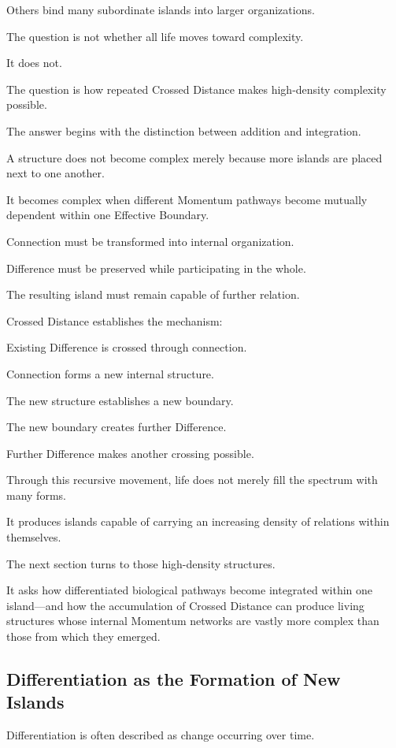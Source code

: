 Others bind many subordinate islands into larger organizations.

The question is not whether all life moves toward complexity.

It does not.

The question is how repeated Crossed Distance makes high-density complexity possible.

The answer begins with the distinction between addition and integration.

A structure does not become complex merely because more islands are placed next to one another.

It becomes complex when different Momentum pathways become mutually dependent within one Effective Boundary.

Connection must be transformed into internal organization.

Difference must be preserved while participating in the whole.

The resulting island must remain capable of further relation.

Crossed Distance establishes the mechanism:

Existing Difference is crossed through connection.

Connection forms a new internal structure.

The new structure establishes a new boundary.

The new boundary creates further Difference.

Further Difference makes another crossing possible.

Through this recursive movement, life does not merely fill the spectrum with many forms.

It produces islands capable of carrying an increasing density of relations within themselves.

The next section turns to those high-density structures.

It asks how differentiated biological pathways become integrated within one island—and how the accumulation of Crossed Distance can produce living structures whose internal Momentum networks are vastly more complex than those from which they emerged. 

\subsection*{\textbf{Differentiation as the Formation of New Islands}}


Differentiation is often described as change occurring over time.

